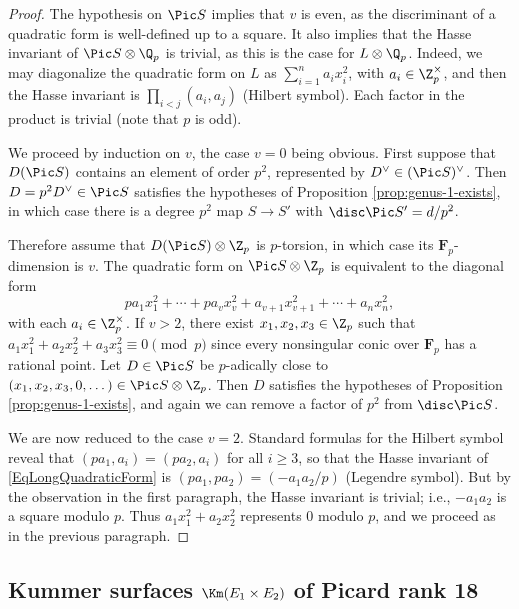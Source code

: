 \documentclass{article}
\def\F{\mathbf{F}}
\begin{document}
\begin{proof}  The hypothesis on $\Pic S$ implies that $v$ is even, as the discriminant of a quadratic form is well-defined up to a square.  It also implies that the Hasse invariant of $\Pic S\otimes\Q_p$ is trivial, as this is the case for $L\otimes\Q_p$.  Indeed, we may diagonalize the quadratic form on $L$ as $\sum_{i=1}^n a_ix_i^2$, with $a_i\in\Z_p^\times$, and then the Hasse invariant is $\prod_{i<j}(a_i,a_j)$ (Hilbert symbol).  Each factor in the product is trivial (note that $p$ is odd).  

We proceed by induction on $v$, the case $v=0$ being obvious.  First suppose that $D(\Pic S)$ contains an element of order $p^2$, represented by $D^\vee\in (\Pic S)^\vee$.   Then $D=p^2D^\vee \in \Pic S$ satisfies the hypotheses of Proposition \ref{prop:genus-1-exists}, in which case there is a degree $p^2$ map $S\to S'$ with $\disc \Pic S'=d/p^2$.

Therefore assume that $D(\Pic S)\otimes\Z_p$ is $p$-torsion, in which case its $\F_p$-dimension is $v$.  The quadratic form on $\Pic S\otimes\Z_p$ is equivalent to the diagonal form
\begin{equation}
\label{EqLongQuadraticForm}
 pa_1x_1^2+\cdots+pa_vx_v^2+a_{v+1}x_{v+1}^2+\cdots +a_nx_n^2, 
 \end{equation}
with each $a_i\in\Z_p^\times$.  If $v>2$, there exist $x_1,x_2,x_3\in\Z_p$ such that $a_1x_1^2+a_2x_2^2+a_3x_3^2\equiv 0\pmod{p}$ since every nonsingular conic over $\F_p$ has a rational point.  Let $D\in \Pic S$ be $p$-adically close to $(x_1,x_2,x_3,0,\dots)\in \Pic S\otimes\Z_p$.  Then  $D$ satisfies the hypotheses of Proposition \ref{prop:genus-1-exists}, and again we can remove a factor of $p^2$ from $\disc \Pic S$.

We are now reduced to the case $v=2$.  Standard formulas for the Hilbert symbol reveal that $(pa_1,a_i)=(pa_2,a_i)$ for all $i\geq 3$, so that the Hasse invariant of \eqref{EqLongQuadraticForm} is $(pa_1,pa_2)=(-a_1a_2/p)$ (Legendre symbol).  But by the observation in the first paragraph, the Hasse invariant is trivial; i.e., $-a_1a_2$ is a square modulo $p$.  Thus $a_1x_1^2+a_2x_2^2$ represents 0 modulo $p$, and we proceed as in the previous paragraph.
\end{proof}

\subsection{Kummer surfaces $\Km(E_1\times E_2)$ of Picard rank 18}
\end{document}
